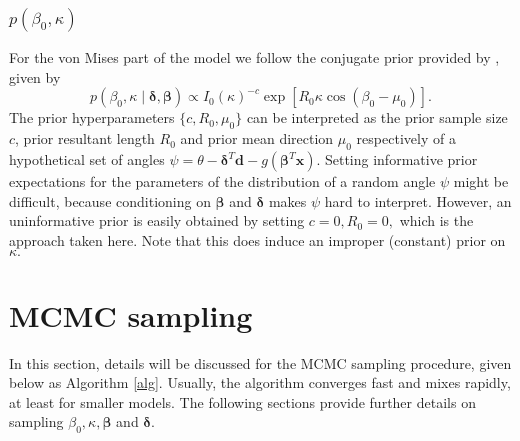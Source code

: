 \documentclass[11pt,a4paper]{article}\usepackage[]{graphicx}\usepackage[]{color}
\newcommand{\bx}{\boldsymbol{x}}
\newcommand{\bd}{\boldsymbol{d}}
\newcommand{\bdt}{\boldsymbol{\delta}}
\newcommand{\bbt}{\boldsymbol{\beta}}
\begin{document}
\subsubsection{$p(\beta_0, \kappa)$}

For the von Mises part of the model we follow the conjugate prior provided by \citet{guttorp1988finding}, given by
\begin{equation}
p(\beta_0, \kappa \mid \bdt, \bbt) \propto I_0(\kappa)^{-c} \exp \left[ R_0 \kappa \cos(\beta_0 - \mu_0) \right].
\end{equation}
The prior hyperparameters \( \{ c, R_0, \mu_0 \} \) can be interpreted as the prior sample size \( c \), prior resultant length \( R_0 \) and prior mean direction \( \mu_0 \) respectively of a hypothetical set of angles \( \psi = \theta - \bdt^T \bd - g\left(\bbt^T \bx \right)\). Setting informative prior expectations for the parameters of the distribution of a random angle \(\psi\) might be difficult, because conditioning on \( \bbt \) and \( \bdt \) makes \( \psi \) hard to interpret. However, an uninformative prior is easily obtained by setting \( c = 0, R_0 = 0,\) which is the approach taken here. Note that this does induce an improper (constant) prior on \( \kappa.\) \label{priorb0kappa}


\section{MCMC sampling}

\label{MCMC}

In this section, details  will be discussed for the MCMC sampling procedure, given below as Algorithm \ref{alg}. Usually, the algorithm converges fast and mixes rapidly, at least for smaller models. The following sections provide further details on sampling \( \beta_0, \kappa, \bbt \) and \( \bdt.\)
\end{document}
